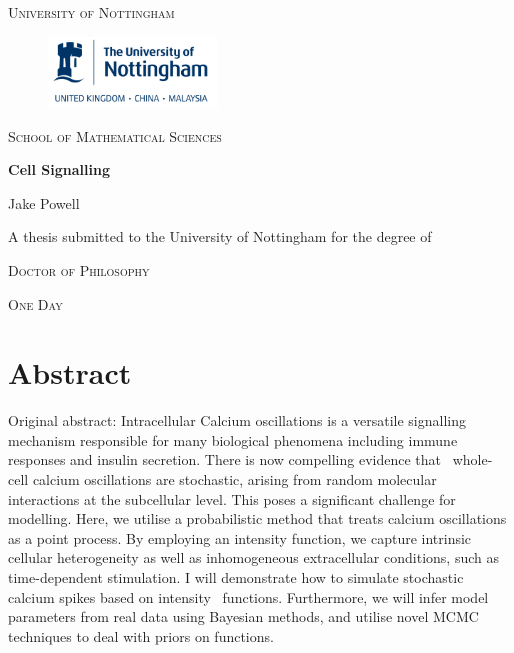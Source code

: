\documentclass[oneside, 12 pt]{book}
\begin{document}
 
 \thispagestyle{empty}
\begin{center}
{\large\textsc{University of Nottingham}}\\

\begin{figure}[!h]
\centering
\includegraphics[width=4.5cm]{UoNlogo}
\end{figure}

{\vspace*{0.7cm}}

{\large\textsc{School of Mathematical Sciences}}\\


{\huge{\bfseries{Cell Signalling}}\par}
\vspace*{2cm}
{\Large{Jake Powell}}\\


{\large A thesis submitted to the University of Nottingham for the degree of \par}
{\large \textsc{Doctor of Philosophy} \par}

{\large{\textsc{One Day}}}\pagebreak
\end{center}


 
\frontmatter

%
\chapter*{Abstract}
Original abstract: Intracellular Calcium oscillations is a versatile signalling mechanism responsible for many biological phenomena including immune responses and insulin secretion. There is now compelling evidence that  whole-cell calcium oscillations are stochastic, arising from random molecular interactions at the subcellular level. This poses a significant challenge for modelling. Here, we utilise a probabilistic method that treats calcium oscillations as a point process. By employing an intensity function, we capture intrinsic cellular heterogeneity as well as inhomogeneous extracellular conditions, such as time-dependent stimulation. I will demonstrate how to simulate stochastic calcium spikes based on intensity  functions. Furthermore, we will infer model parameters from real data using Bayesian methods, and utilise novel MCMC techniques to deal with priors on functions. 
 
\end{document}
